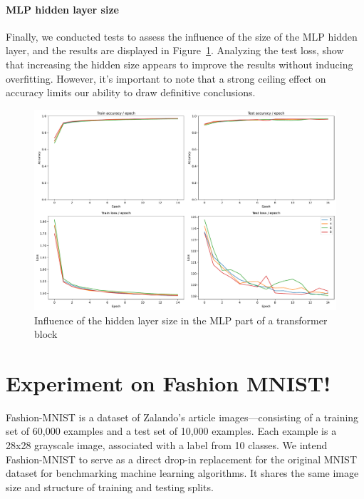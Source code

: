 \paragraph{MLP hidden layer size}
Finally, we conducted tests to assess the influence of the size of the MLP hidden layer, and the results are displayed in Figure~\ref{fig:mlp_ratio_influence}. Analyzing the test loss, show that increasing the hidden size appears to improve the results without inducing overfitting. However, it's important to note that a strong ceiling effect on accuracy limits our ability to draw definitive conclusions.

\begin{figure}[H]
    \centering
    \includegraphics*[width=\textwidth]{figs/Transformers/mlp_ratio_influence.pdf}
    \caption{Influence of the hidden layer size in the MLP part of a transformer block}
    \label{fig:mlp_ratio_influence}
\end{figure}

\section{Experiment on Fashion MNIST!}
Fashion-MNIST is a dataset of Zalando's article images—consisting of a training set of 60,000 examples and a test set of 10,000 examples. Each example is a 28x28 grayscale image, associated with a label from 10 classes. We intend Fashion-MNIST to serve as a direct drop-in replacement for the original MNIST dataset for benchmarking machine learning algorithms. It shares the same image size and structure of training and testing splits.

